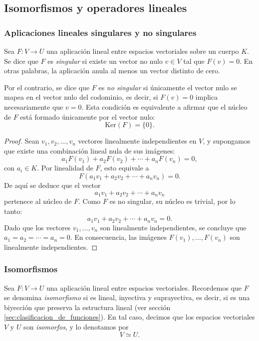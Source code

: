 \subsection{Isomorfismos y operadores lineales}

\subsubsection{Aplicaciones lineales singulares y no singulares}

Sea \(F: V \rightarrow U\) una aplicación lineal entre espacios vectoriales sobre un cuerpo \(K\). Se dice que \(F\) es \textit{singular} si existe un vector no nulo \(v \in V\) tal que \(F(v) = 0\). En otras palabras, la aplicación anula al menos un vector distinto de cero. 

Por el contrario, se dice que \(F\) es \textit{no singular} si únicamente el vector nulo se mapea en el vector nulo del codominio, es decir, si \(F(v) = 0\) implica necesariamente que \(v = 0\). Esta condición es equivalente a afirmar que el núcleo de \(F\) está formado únicamente por el vector nulo:
\[
\text{Ker}(F) = \{0\}.
\]


\begin{proof}
Sean \(v_1, v_2, \dots, v_n\) vectores linealmente independientes en \(V\), y supongamos que existe una combinación lineal nula de sus imágenes:
\[
a_1 F(v_1) + a_2 F(v_2) + \cdots + a_n F(v_n) = 0,
\]
con \(a_i \in K\). Por linealidad de \(F\), esto equivale a
\[
F(a_1 v_1 + a_2 v_2 + \cdots + a_n v_n) = 0.
\]
De aquí se deduce que el vector
\[
a_1 v_1 + a_2 v_2 + \cdots + a_n v_n
\]
pertenece al núcleo de \(F\). Como \(F\) es no singular, su núcleo es trivial, por lo tanto:
\[
a_1 v_1 + a_2 v_2 + \cdots + a_n v_n = 0.
\]
Dado que los vectores \(v_1, \dots, v_n\) son linealmente independientes, se concluye que \(a_1 = a_2 = \cdots = a_n = 0\). En consecuencia, las imágenes \(F(v_1), \dots, F(v_n)\) son linealmente independientes.
\end{proof}

\subsubsection{Isomorfismos}

Sea \(F: V \rightarrow U\) una aplicación lineal entre espacios vectoriales. Recordemos que \(F\) se denomina \textit{isomorfismo} si es lineal, inyectiva y suprayectiva, es decir, si es una biyección que preserva la estructura lineal (ver sección \ref{sec:clasificacion_de_funciones}). En tal caso, decimos que los espacios vectoriales \(V\) y \(U\) son \textit{isomorfos}, y lo denotamos por
\[
V \simeq U.
\]

